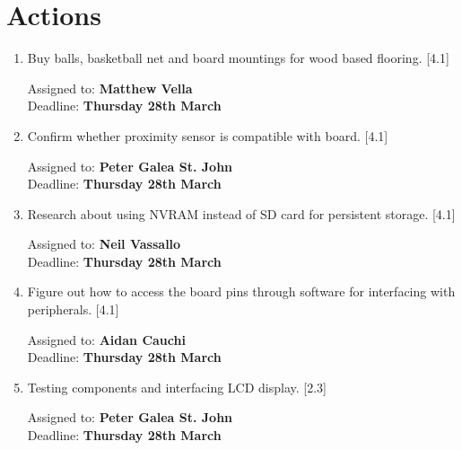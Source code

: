 \documentclass[11pt,a4paper]{article}
\begin{document}
\section*{Actions}

\begin{enumerate}

\item Buy balls, basketball net and board mountings for wood based flooring. [4.1]
\begin{flushright}
Assigned to: \textbf{Matthew Vella} \\
Deadline: \textbf{Thursday 28th March}
\end{flushright}

\item Confirm whether proximity sensor is compatible with board. [4.1]
\begin{flushright}
Assigned to: \textbf{Peter Galea St. John} \\
Deadline: \textbf{Thursday 28th March}
\end{flushright}

\item Research about using NVRAM instead of SD card for persistent storage. [4.1]
\begin{flushright}
	Assigned to: \textbf{Neil Vassallo} \\
	Deadline: \textbf{Thursday 28th March}
\end{flushright}

\item Figure out how to access the board pins through software for interfacing with peripherals. [4.1]
\begin{flushright}
	Assigned to: \textbf{Aidan Cauchi} \\
	Deadline: \textbf{Thursday 28th March}
\end{flushright}

\item Testing components and interfacing LCD display. [2.3]
\begin{flushright}
Assigned to: \textbf{Peter Galea St. John} \\
Deadline: \textbf{Thursday 28th March}
\end{flushright}

\end{enumerate}
\end{document}
